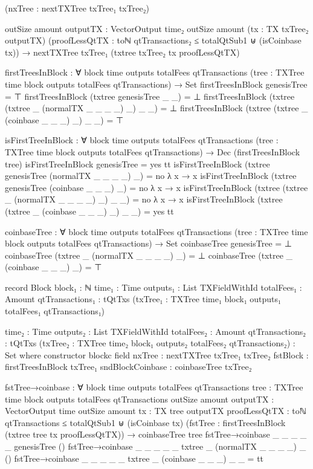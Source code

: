 \documentclass{beamer}
\begin{document}
\begin{code}
          (nxTree : nextTXTree txTree₁ txTree₂)

          {outSize amount}
          {outputTX : VectorOutput time₂ outSize amount}
          (tx : TX txTree₂ outputTX)
          (proofLessQtTX :
              toℕ qtTransactions₂ ≤ totalQtSub1
              ⊎
              (isCoinbase tx))
          → nextTXTree txTree₁ (txtree txTree₂ tx proofLessQtTX)

      firstTreesInBlock : ∀
        {block time outputs totalFees qtTransactions}
        (tree : TXTree time block outputs totalFees qtTransactions)
        → Set
      firstTreesInBlock genesisTree = ⊤
      firstTreesInBlock (txtree genesisTree _ _) = ⊥
      firstTreesInBlock (txtree (txtree _ (normalTX _ _ _ _) _) _ _) = ⊥
      firstTreesInBlock (txtree (txtree _ (coinbase _ _ _) _) _ _) = ⊤

      isFirstTreeInBlock : ∀
        {block time outputs totalFees qtTransactions}
        (tree : TXTree time block outputs totalFees qtTransactions)
        → Dec (firstTreesInBlock tree)
      isFirstTreeInBlock genesisTree = yes tt
      isFirstTreeInBlock (txtree genesisTree (normalTX _ _ _ _) _) = no λ x → x
      isFirstTreeInBlock (txtree genesisTree (coinbase _ _ _) _) = no λ x → x
      isFirstTreeInBlock (txtree (txtree _ (normalTX _ _ _ _) _) _ _) = no λ x → x
      isFirstTreeInBlock (txtree (txtree _ (coinbase _ _ _) _) _ _) = yes tt

      coinbaseTree : ∀
        {block time outputs totalFees qtTransactions}
        (tree : TXTree time block outputs totalFees qtTransactions)
        → Set
      coinbaseTree genesisTree = ⊥
      coinbaseTree (txtree _ (normalTX _ _ _ _) _) = ⊥
      coinbaseTree (txtree _ (coinbase _ _ _) _) = ⊤

      record Block
        {block₁ : ℕ}
        {time₁ : Time}
        {outputs₁ : List TXFieldWithId}
        {totalFees₁ : Amount}
        {qtTransactions₁ : tQtTxs}
        (txTree₁ : TXTree time₁ block₁ outputs₁ totalFees₁ qtTransactions₁)

        {time₂ : Time}
        {outputs₂ : List TXFieldWithId}
        {totalFees₂ : Amount}
        {qtTransactions₂ : tQtTxs}
        (txTree₂ : TXTree time₂ block₁ outputs₂ totalFees₂ qtTransactions₂)
        : Set where
        constructor blockc
        field
          nxTree           : nextTXTree txTree₁ txTree₂
          fstBlock         : firstTreesInBlock txTree₁
          sndBlockCoinbase : coinbaseTree txTree₂

      fstTree→coinbase : ∀
        {block time outputs totalFees qtTransactions}
        {tree : TXTree time block outputs totalFees qtTransactions}
        {outSize amount}
        {outputTX : VectorOutput time outSize amount}
        {tx : TX tree outputTX}
        {proofLessQtTX :
            toℕ qtTransactions ≤ totalQtSub1
            ⊎
            (isCoinbase tx)}
        (fstTree : firstTreesInBlock (txtree tree tx proofLessQtTX))
        → coinbaseTree tree
      fstTree→coinbase {_} {_} {_} {_} {_} {genesisTree} ()
      fstTree→coinbase {_} {_} {_} {_} {_} {txtree _ (normalTX _ _ _ _) _} ()
      fstTree→coinbase {_} {_} {_} {_} {_} {txtree _ (coinbase _ _ _) _} _ = tt


\end{code}
\end{document}
